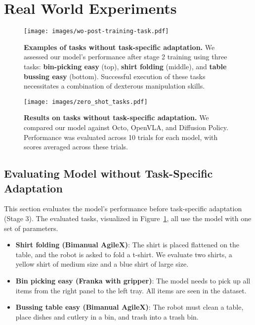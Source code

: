 \section{Real World Experiments}
\begin{figure}[t]
    \centering
    \texttt{[image: images/wo-post-training-task.pdf]}
    \caption{\textbf{Examples of tasks without task-specific adaptation.} We assessed our model's performance after stage 2 training using three tasks: \textbf{bin-picking easy} (top), \textbf{shirt folding} (middle), and \textbf{table bussing easy} (bottom). Successful execution of these tasks necessitates a combination of dexterous manipulation skills.}\label{fig:easy_task_suite}
\end{figure}
\begin{figure}[t]
    \centering
    \texttt{[image: images/zero\_shot\_tasks.pdf]}
    \caption{\textbf{Results on tasks without task-specific adaptation.} We compared our model against Octo, OpenVLA, and Diffusion Policy. Performance was evaluated across 10 trials for each model, with scores averaged across these trials.}\label{fig:zero_shot_tasks_results}
\end{figure}




\subsection{Evaluating Model without Task-Specific Adaptation}
\label{sec:no_post_training}
This section evaluates the model's performance before task-specific adaptation (Stage 3). The evaluated tasks, visualized in Figure~\ref{fig:easy_task_suite}, all use the model with one set of parameters.

\begin{itemize}
    \item \textbf{Shirt folding (Bimanual AgileX)}: The shirt is placed flattened on the table, and the robot is asked to fold a t-shirt. We evaluate two shirts, a yellow shirt of medium size and a blue shirt of large size. 
    \item \textbf{Bin picking easy (Franka with gripper)}: The model needs to pick up all items from the right panel to the left tray. All items are seen in the dataset. 
    \item \textbf{Bussing table easy (Bimanual AgileX)}: The robot must clean a table, place dishes and cutlery in a bin, and trash into a trash bin.
\end{itemize}

